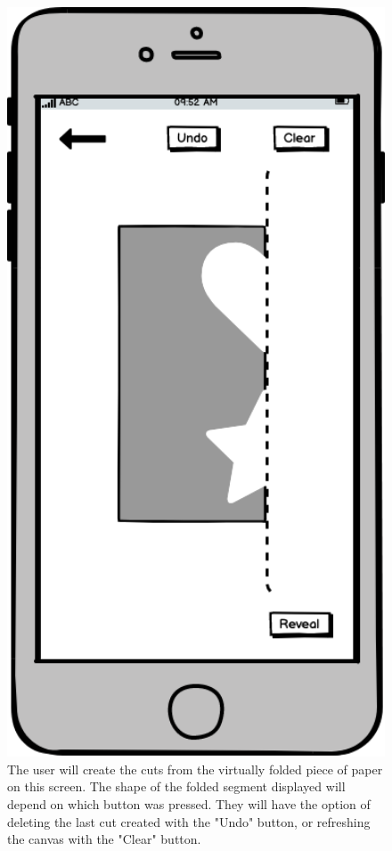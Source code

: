 \documentclass[11pt]{article}
\begin{document}
            \begin{figure}
                \begin{minipage}[c]{0.35\textwidth}
                \includegraphics[width=1\textwidth]{Images/Prototype/prototypeCreatePattern.png}
                \end{minipage}\hfill
                \begin{minipage}[c]{0.65\textwidth}
                \caption{The user will create the cuts from the virtually folded piece of paper on this screen. The shape of the folded segment displayed will depend on which button was pressed.
                They will have the option of deleting the last cut created with the "Undo" button, or refreshing the canvas with the "Clear" button.}
                \label{fig:createPattern}
                \end{minipage}
            \end{figure}
            
\end{document}
